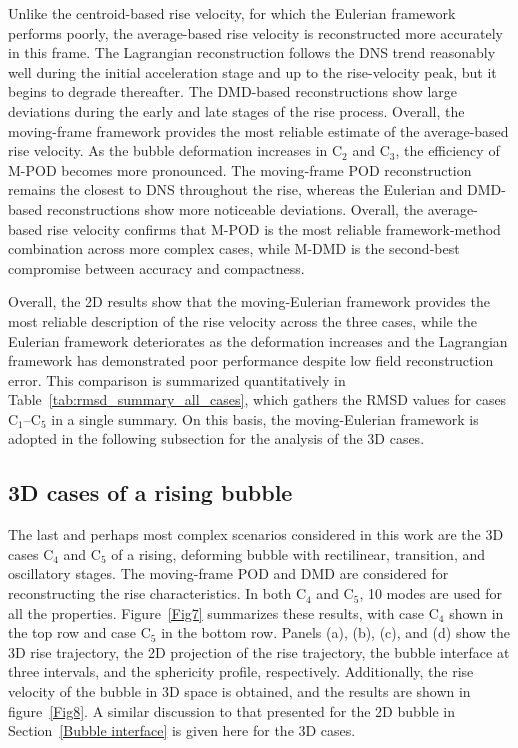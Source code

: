 \documentclass[a4paper,fleqn]{cas-sc}
\begin{document}
	Unlike the centroid-based rise velocity, for which the Eulerian framework performs poorly, the average-based rise velocity is reconstructed more accurately in this frame. The Lagrangian reconstruction follows the DNS trend reasonably well during the initial acceleration stage and up to the rise-velocity peak, but it begins to degrade thereafter. The DMD-based reconstructions show large deviations during the early and late stages of the rise process. Overall, the moving-frame framework provides the most reliable estimate of the average-based rise velocity. As the bubble deformation increases in C$_2$ and C$_3$, the efficiency of M-POD becomes more pronounced. The moving-frame POD reconstruction remains the closest to DNS throughout the rise, whereas the Eulerian and DMD-based reconstructions show more noticeable deviations. Overall, the average-based rise velocity confirms that M-POD is the most reliable framework-method combination across more complex cases, while M-DMD is the second-best compromise between accuracy and compactness.
	
	Overall, the 2D results show that the moving-Eulerian framework provides the most reliable description of the rise velocity across the three cases, while the Eulerian framework deteriorates as the deformation increases and the Lagrangian framework has demonstrated poor performance despite low field reconstruction error. This comparison is summarized quantitatively in Table~\ref{tab:rmsd_summary_all_cases}, which gathers the RMSD values for cases C$_1$--C$_5$ in a single summary. On this basis, the moving-Eulerian framework is adopted in the following subsection for the analysis of the 3D cases.
	
	\subsection{3D cases of a rising bubble}
	
	The last and perhaps most complex scenarios considered in this work are the 3D cases C$_4$ and C$_5$ of a rising, deforming bubble with rectilinear, transition, and oscillatory stages. The moving-frame POD and DMD are considered for reconstructing the rise characteristics. In both C$_4$ and C$_5$, 10 modes are used for all the properties. Figure~\ref{Fig7} summarizes these results, with case C$_4$ shown in the top row and case C$_5$ in the bottom row. Panels (a), (b), (c), and (d) show the 3D rise trajectory, the 2D projection of the rise trajectory, the bubble interface at three intervals, and the sphericity profile, respectively. Additionally, the rise velocity of the bubble in 3D space is obtained, and the results are shown in figure~\ref{Fig8}. A similar discussion to that presented for the 2D bubble in Section~\ref{Bubble interface} is given here for the 3D cases.
	
\end{document}
